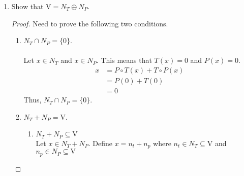 \documentclass[11pt]{scrartcl}
\begin{document}
\begin{enumerate}[label=\alph*.]
{\begin{proof}
\begin{enumerate}[label=\roman*.]
{\begin{enumerate}[label=\arabic*.]
{				                  Let $x \in N_T$. By definition, $T(x) = 0$.
				                  \begin{align*}
					                  P \circ T(x) + T \circ P(x) & = x \\
					                  P(0) + T \circ P(x)         & = x \\
					                  T \circ P(x)                & = x
				                  \end{align*}
				                  Notice that $P(x) \in N_P$, so $x \in T(N_P)$. Thus, $N_T  \subseteq T(N_P)$.
				                  }
				            \item{
				                  $T(N_P) \subseteq N_T$\\
				                  Let $T(x) \in T(N_P)$ where $x \in N_P$.\\
				                  $T \circ T(x) = 0$ so $T(x) \in N_T$. Thus, $T(N_P) \subseteq N_T$.
				                  }
			            \end{enumerate}
			            Therfore, $N_P = P(N_T)$.
			            }
		      \end{enumerate}
	      \end{proof}
	      }
	\item{
	      Show that $\mathrm{V} = N_T \oplus N_P$.
	      \begin{proof}
		      Need to prove the following two conditions.
		      \begin{enumerate}[label=\roman*.]
			      \item{
			            $N_T \cap N_P = \{0\}$.	 \\\-\\
			            Let $x \in N_T$ and $x \in N_P$. This means that $T(x) = 0$ and $P(x) = 0$.
			            \begin{align*}
				            x & = P \circ T(x) + T \circ P(x) \\
				              & = P(0) + T(0)                 \\
				              & = 0
			            \end{align*}
			            Thus, $N_T \cap N_P = \{0\}$.\\
			            }
			      \item{
			            $N_T + N_P = \mathrm{V}$.
			            \begin{enumerate}[label=\arabic*.]
				            \item{
				                  $N_T + N_P \subseteq \mathrm{V}$\\
				                  Let $x \in N_T + N_P$. Define $x = n_t + n_p$ where $n_t \in N_T \subseteq \mathrm{V}$ and $n_p \in N_P \subseteq \mathrm{V}$
}
\end{enumerate}}
\end{enumerate}
\end{proof}}
\end{enumerate}
\end{document}
